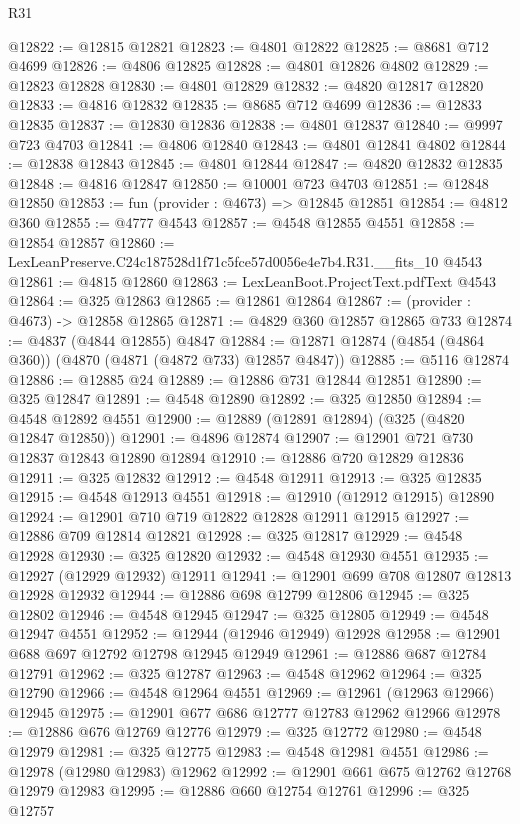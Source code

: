 \begin{lexlean}{R31}
\begin{coremodule}
@12822 := @12815 @12821
@12823 := @4801 @12822
@12825 := @8681 @712 @4699
@12826 := @4806 @12825
@12828 := @4801 @12826 @4802
@12829 := @12823 @12828
@12830 := @4801 @12829
@12832 := @4820 @12817 @12820
@12833 := @4816 @12832
@12835 := @8685 @712 @4699
@12836 := @12833 @12835
@12837 := @12830 @12836
@12838 := @4801 @12837
@12840 := @9997 @723 @4703
@12841 := @4806 @12840
@12843 := @4801 @12841 @4802
@12844 := @12838 @12843
@12845 := @4801 @12844
@12847 := @4820 @12832 @12835
@12848 := @4816 @12847
@12850 := @10001 @723 @4703
@12851 := @12848 @12850
@12853 := fun (provider : @4673) => @12845 @12851
@12854 := @4812 @360
@12855 := @4777 @4543
@12857 := @4548 @12855 @4551
@12858 := @12854 @12857
@12860 := LexLeanPreserve.C24c187528d1f71c5fce57d0056e4e7b4.R31.__fits_10 @4543
@12861 := @4815 @12860
@12863 := LexLeanBoot.ProjectText.pdfText @4543
@12864 := @325 @12863
@12865 := @12861 @12864
@12867 := (provider : @4673) -> @12858 @12865
@12871 := @4829 @360 @12857 @12865 @733
@12874 := @4837 (@4844 @12855) @4847
@12884 := @12871 @12874 (@4854 (@4864 @360)) (@4870 (@4871 (@4872 @733) @12857 @4847))
@12885 := @5116 @12874
@12886 := @12885 @24
@12889 := @12886 @731 @12844 @12851
@12890 := @325 @12847
@12891 := @4548 @12890
@12892 := @325 @12850
@12894 := @4548 @12892 @4551
@12900 := @12889 (@12891 @12894) (@325 (@4820 @12847 @12850))
@12901 := @4896 @12874
@12907 := @12901 @721 @730 @12837 @12843 @12890 @12894
@12910 := @12886 @720 @12829 @12836
@12911 := @325 @12832
@12912 := @4548 @12911
@12913 := @325 @12835
@12915 := @4548 @12913 @4551
@12918 := @12910 (@12912 @12915) @12890
@12924 := @12901 @710 @719 @12822 @12828 @12911 @12915
@12927 := @12886 @709 @12814 @12821
@12928 := @325 @12817
@12929 := @4548 @12928
@12930 := @325 @12820
@12932 := @4548 @12930 @4551
@12935 := @12927 (@12929 @12932) @12911
@12941 := @12901 @699 @708 @12807 @12813 @12928 @12932
@12944 := @12886 @698 @12799 @12806
@12945 := @325 @12802
@12946 := @4548 @12945
@12947 := @325 @12805
@12949 := @4548 @12947 @4551
@12952 := @12944 (@12946 @12949) @12928
@12958 := @12901 @688 @697 @12792 @12798 @12945 @12949
@12961 := @12886 @687 @12784 @12791
@12962 := @325 @12787
@12963 := @4548 @12962
@12964 := @325 @12790
@12966 := @4548 @12964 @4551
@12969 := @12961 (@12963 @12966) @12945
@12975 := @12901 @677 @686 @12777 @12783 @12962 @12966
@12978 := @12886 @676 @12769 @12776
@12979 := @325 @12772
@12980 := @4548 @12979
@12981 := @325 @12775
@12983 := @4548 @12981 @4551
@12986 := @12978 (@12980 @12983) @12962
@12992 := @12901 @661 @675 @12762 @12768 @12979 @12983
@12995 := @12886 @660 @12754 @12761
@12996 := @325 @12757

\end{coremodule}
\end{lexlean}

